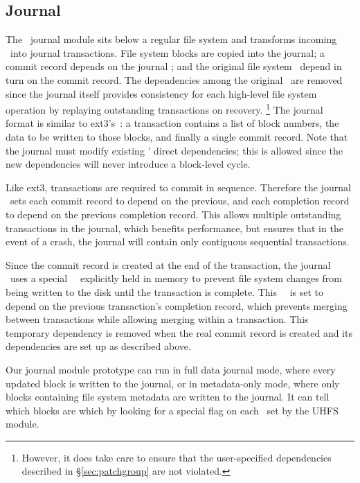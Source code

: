 
\subsection{Journal}
\label{sec:modules:journal}

The \Kudos\ journal module sits below a regular file system and transforms
incoming \patches\ into journal transactions.
%
File system blocks are copied into the journal; a commit record depends on the
journal \patches; and the original file system \patches\ depend in turn on the
commit record.
%
The dependencies among the original \patches\ are removed since the journal
itself provides consistency for each high-level file system operation by
replaying outstanding transactions on recovery.
\footnote{However, it does take care to ensure that the user-specified
dependencies described in \S\ref{sec:patchgroup} are not violated.}
%
The journal format is similar to ext3's~\cite{tweedie98journaling}: a
transaction contains a list of block numbers, the data to be written to
those blocks, and finally a single commit record.
%
Note that the journal must modify existing \patches' direct dependencies;
this is allowed since the new dependencies will never introduce a
block-level cycle.

Like ext3, transactions are required to commit in sequence. Therefore the
journal \module\ sets each commit record to depend on the previous, and each
completion record to depend on the previous completion record. This allows
multiple outstanding transactions in the journal, which benefits performance,
but ensures that in the event of a crash, the journal will contain only
contiguous sequential transactions.

Since the commit record is created at the end of the transaction, the journal
\module\ uses a special \noop\ \patch\ explicitly held in memory to prevent
file system changes from being written to the disk until the transaction is
complete. This \noop\ \patch\ is set to depend on the previous transaction's
completion record, which prevents merging between transactions while allowing
merging within a transaction. This temporary dependency is removed when the
real commit record is created and its dependencies are set up as described
above.



Our journal module prototype can run in full data journal mode, where every
updated block is written to the journal, or in metadata-only mode, where only
blocks containing file system metadata are written to the journal. It can
tell which blocks are which by looking for a special flag on each \patch\ set
by the UHFS module.
